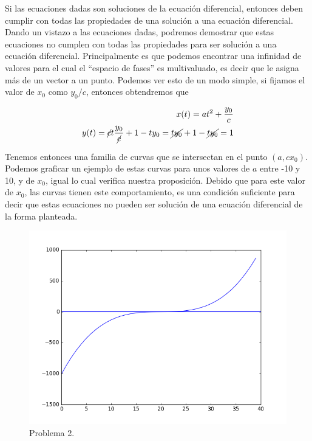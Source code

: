 \documentclass[a4paper,10pt]{article}
\numberwithin{equation}{section}
\begin{document}
Si las ecuaciones dadas son soluciones de la ecuación diferencial, entonces deben
cumplir con todas las propiedades de una solución a una ecuación diferencial. Dando
un vistazo a las ecuaciones dadas, podremos demostrar que estas ecuaciones no cumplen
con todas las propiedades para ser solución a una ecuación diferencial. Principalmente
es que podemos encontrar una infinidad de valores para el cual el ``espacio de fases'' es 
multivaluado, es decir que le asigna más de un vector a un punto. Podemos ver esto de un 
modo simple, si fijamos el valor de $x_0$ como $y_0/c$, entonces obtendremos que

\begin{align}
 \begin{split}
  x(t) =  at^2 + \frac{y_0}{c} \\
  y(t) = \cancel{c} t \frac{y_0}{\cancel{c}} + 1 - t y_0 = 
  \cancel{t y_0} + 1 -\cancel{t y_0} = 1
  \label{eq:ec1prob2}
 \end{split}
\end{align}

Tenemos entonces una familia de curvas que se intersectan en el punto $(a,cx_0)$. Podemos
graficar un ejemplo de estas curvas para unos valores de $a$ entre -10 y 10, y de $x_0$, igual
lo cual verifica nuestra proposición. Debido que para este valor de $x_0$, las curvas tienen
este comportamiento, es una condición suficiente para decir que estas ecuaciones no pueden
ser solución de una ecuación diferencial de la forma planteada.

\begin{figure}[h!]
 \centering
\includegraphics[scale=0.3]{problema2fig1}
\caption{Problema 2.}
\label{fig:problema2fig1}
\end{figure}
\end{document}

